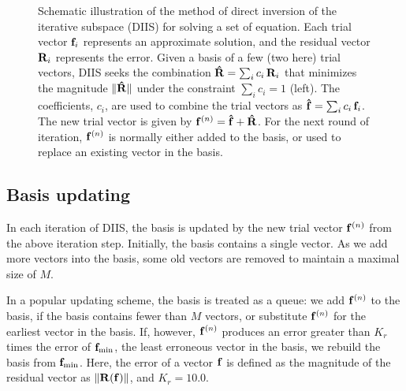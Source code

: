 \documentclass[aip,jcp,preprint,superscriptaddress]{revtex4-1}
\begin{document}
\begin{figure}
  \caption{\label{fig:scheme}
    Schematic illustration of the method of
    direct inversion of the iterative subspace (DIIS)
    for solving a set of equation.
    Each trial vector $\mathbf{f}_i$
    represents an approximate solution,
    and the residual vector $\mathbf{R}_i$
    represents the error.
    Given a basis of a few (two here) trial vectors,
    DIIS seeks the combination
    $\mathbf{\hat R} = \sum_i c_i \, \mathbf{R}_i$
    that minimizes the magnitude
    $\| \mathbf{\hat R} \|$
    under the constraint
    $\sum_i c_i = 1$ (left).
    The coefficients, $c_i$, are used
    to combine the trial vectors as
    $\mathbf{\hat f} = \sum_i c_i \, \mathbf{f}_i$.
    The new trial vector is given by
    $\mathbf{f}^{(n)} = \mathbf{\hat f} + \mathbf{\hat R}$.
    For the next round of iteration,
    $\mathbf{f}^{(n)}$ is normally either added
    to the basis, or used to replace an existing vector
    in the basis.
  }
\end{figure}




\subsection{Basis updating}



In each iteration of DIIS,
the basis is updated
by the new trial vector $\mathbf{f}^{(n)}$
from the above iteration step.
%
Initially,
the basis contains a single vector.
%
As we add more vectors into the basis,
some old vectors are removed
to maintain a maximal size of $M$.



In a popular updating scheme\cite{kovalenko1999},
the basis is treated as a queue:
%
we add $\mathbf{f}^{(n)}$ to the basis,
if the basis contains fewer than $M$ vectors,
%
or substitute $\mathbf{f}^{(n)}$ for the earliest vector in the basis.
%
If, however, $\mathbf{f}^{(n)}$
produces an error greater than
$K_r$ times the error of
$\mathbf{f}_\mathrm{min}$,
the least erroneous vector in the basis,
%
we rebuild the basis
from $\mathbf{f}_\mathrm{min}$.
%
Here, the error of a vector $\mathbf{f}$ is defined as
the magnitude of the residual vector as
$\| \mathbf{R}(\mathbf{f}) \|$,
and
$K_r = 10.0$\cite{
kovalenko1999}.
\end{document}
